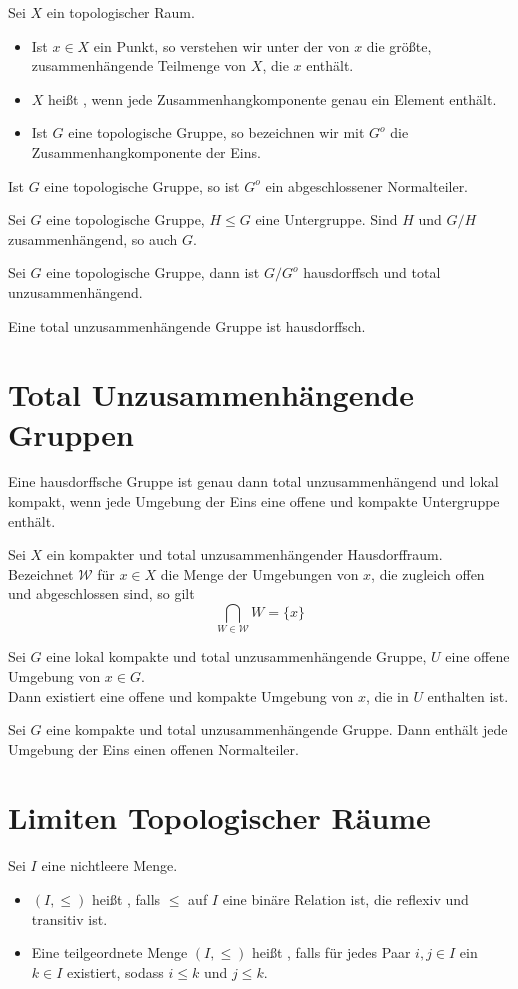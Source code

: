 \documentclass{book}
\begin{document}
\Def{}
Sei $X$ ein topologischer Raum.
\begin{itemize}
\item Ist $x \in X$ ein Punkt, so verstehen wir unter der  von $x$ die größte, zusammenhängende Teilmenge von $X$, die $x$ enthält.
\item $X$ heißt , wenn jede Zusammenhangkomponente genau ein Element enthält.
\item Ist $G$ eine topologische Gruppe, so bezeichnen wir mit $G^o$ die Zusammenhangkomponente der Eins. 
\end{itemize}

\Prop{}
Ist $G$ eine topologische Gruppe, so ist $G^o$ ein abgeschlossener Normalteiler.

\Prop{}
Sei $G$ eine topologische Gruppe, $H \leq G$ eine Untergruppe. Sind $H$ und $G/H$ zusammenhängend, so auch $G$.

\Prop{}
Sei $G$ eine topologische Gruppe, dann ist $G/G^o$ hausdorffsch und total unzusammenhängend.

\Bem{}
Eine total unzusammenhängende Gruppe ist hausdorffsch.

\section{Total Unzusammenhängende Gruppen}
\Satz{}
Eine hausdorffsche Gruppe ist genau dann total unzusammenhängend und lokal kompakt, wenn jede Umgebung der Eins eine offene und kompakte Untergruppe enthält.

\Lem{}
Sei $X$ ein kompakter und total unzusammenhängender Hausdorffraum. Bezeichnet $\mathcal{W}$ für $x \in X$ die Menge der Umgebungen von $x$, die zugleich offen und abgeschlossen sind, so gilt
\[ \bigcap_{W\in \mathcal{W}} W = \{x\} \]

\Lem{}
Sei $G$ eine lokal kompakte und total unzusammenhängende Gruppe, $U$ eine offene Umgebung von $x \in G$.\\
Dann existiert eine offene und kompakte Umgebung von $x$, die in $U$ enthalten ist.

\Kor{}
Sei $G$ eine kompakte und total unzusammenhängende Gruppe. Dann enthält jede Umgebung der Eins einen offenen Normalteiler.

\section{Limiten Topologischer Räume}
Sei $I$ eine nichtleere Menge.
\begin{itemize}
	\item $(I,\leq)$ heißt , falls $\leq$ auf $I$ eine binäre Relation ist, die reflexiv und transitiv ist.
	\item Eine teilgeordnete Menge $(I,\leq)$ heißt , falls für jedes Paar $i,j \in I$ ein $k \in I$ existiert, sodass $i \leq k$ und $j\leq k$.
\end{itemize}
\end{document}
